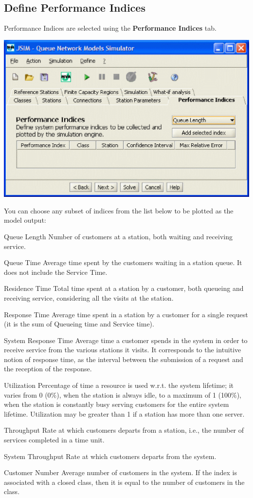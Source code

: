 \subsection{Define Performance Indices}
\label{sec:DefinePerformanceIndices}
Performance Indices are selected using the \textbf{Performance Indices} tab.
\begin{center}
\includegraphics[scale=.5]{img/jsim/define_indices1.eps}
\end{center}
You can choose any subset of indices from the list below to be
plotted as the model output:
\begin{description*}
\item [Queue Length] Number of customers at a station, both
waiting and receiving service. \item [Queue Time] Average time
spent by the customers waiting in a station queue. It does not
include the Service Time. \item [Residence Time] Total time spent
at a station by a customer, both queueing and receiving service,
considering all the visits at the station. \item [Response Time]
Average time spent in a station by a customer for a single request
(it is the sum of Queueing time and Service time). \item [System
Response Time] Average time a customer spends in the system in
order to receive service from the various stations it visits. It
corresponds to the intuitive notion of response time, as the
interval between the submission of a request and the reception of
the response. \item [Utilization] Percentage of time a resource is
used w.r.t. the system lifetime; it varies from 0 (0\%), when the
station is always idle, to a maximum of 1 (100\%), when the
station is constantly busy serving customers for the entire system
lifetime. Utilization may be greater than 1 if a station has more
than one server. \item [Throughput] Rate at which customers
departs from a station, i.e., the number of services completed in
a time unit. \item [System Throughput] Rate at which customers
departs from the system. \item [Customer Number] Average number of
customers in the system. If the index is associated with a closed
class, then it is  equal to the number of customers in the class.
\end{description*}
